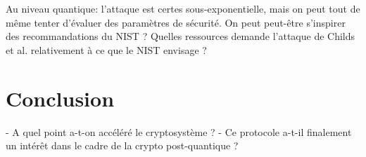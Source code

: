 \documentclass{article}
\theoremstyle{definition}
\begin{document}
Au niveau quantique: l'attaque est certes sous-exponentielle, mais on
peut tout de même tenter d'évaluer des paramètres de sécurité. On peut
peut-être s'inspirer des recommandations du NIST ? Quelles ressources
demande l'attaque de Childs et al. relativement à ce que le NIST
envisage ?


\section{Conclusion}

- A quel point a-t-on accéléré le cryptosystème ?
- Ce protocole a-t-il finalement un intérêt dans le cadre de la crypto post-quantique ?




\end{document}
